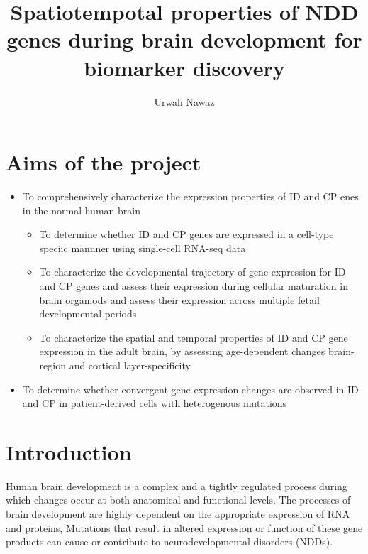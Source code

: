 \documentclass[12pt]{article}
\title{Spatiotempotal properties of NDD genes during brain development for biomarker discovery}
\author{Urwah Nawaz}
\begin{document}
\begin{titlepage}
    \maketitle
\end{titlepage}


\section{Aims of the project}

\begin{itemize}
	\item To comprehensively characterize the expression properties of ID and CP enes in the normal human brain
	\begin{itemize}
		\item To determine whether ID and CP genes are expressed in a cell-type speciic mannner using single-cell RNA-seq data
		\item To characterize the developmental trajectory of gene expression for ID and CP genes and assess their expression during cellular maturation in brain organiods and assess their expression across multiple fetail developmental periods 
		\item  To characterize the spatial and temporal properties of ID and CP gene expression in the adult brain, by assessing age-dependent changes  brain-region and cortical layer-specificity 
		
	\end{itemize}
	
	\item To determine whether convergent gene expression changes are observed in ID and CP in patient-derived cells with heterogenous mutations 
	
\end{itemize}

\section{Introduction}

Human brain development is a complex and a tightly regulated process during which changes occur at both anatomical and functional levels.
The processes of brain development are highly dependent on the appropriate expression of RNA and proteins, 
Mutations that result in altered expression or function of these gene products can cause or contribute to neurodevelopmental disorders (NDDs). 
\end{document}
